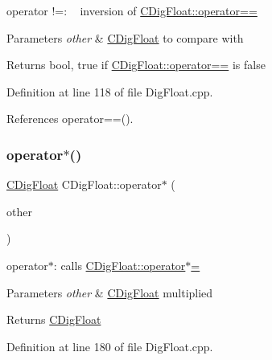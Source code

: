 operator !=\+: ~\newline
 inversion of \hyperlink{classCDigFloat_ad8980d984bf2bab71d15b830fd0180a5}{C\+Dig\+Float\+::operator==} 


\begin{DoxyParams}{Parameters}
{\em other} & \hyperlink{classCDigFloat}{C\+Dig\+Float} to compare with \\
\hline
\end{DoxyParams}
\begin{DoxyReturn}{Returns}
bool, true if \hyperlink{classCDigFloat_ad8980d984bf2bab71d15b830fd0180a5}{C\+Dig\+Float\+::operator==} is false 
\end{DoxyReturn}


Definition at line 118 of file Dig\+Float.\+cpp.



References operator==().

\mbox{\label{classCDigFloat_a79029fee4d38f893d72209e7d6eb89ed}} 
\subsubsection{\texorpdfstring{operator$\ast$()}{operator*()}\hspace{0.1cm}{\footnotesize\ttfamily [1/2]}}
{\footnotesize\ttfamily \hyperlink{classCDigFloat}{C\+Dig\+Float} C\+Dig\+Float\+::operator$\ast$ (\begin{DoxyParamCaption}\item[{const \hyperlink{classCDigFloat}{C\+Dig\+Float} \&}]{other }\end{DoxyParamCaption})}



operator$\ast$\+: calls \hyperlink{classCDigFloat_a9535d47a31a3f1cfa487cc8c567a4a12}{C\+Dig\+Float\+::operator$\ast$=} 


\begin{DoxyParams}{Parameters}
{\em other} & \hyperlink{classCDigFloat}{C\+Dig\+Float} multiplied \\
\hline
\end{DoxyParams}
\begin{DoxyReturn}{Returns}
\hyperlink{classCDigFloat}{C\+Dig\+Float} 
\end{DoxyReturn}


Definition at line 180 of file Dig\+Float.\+cpp.

